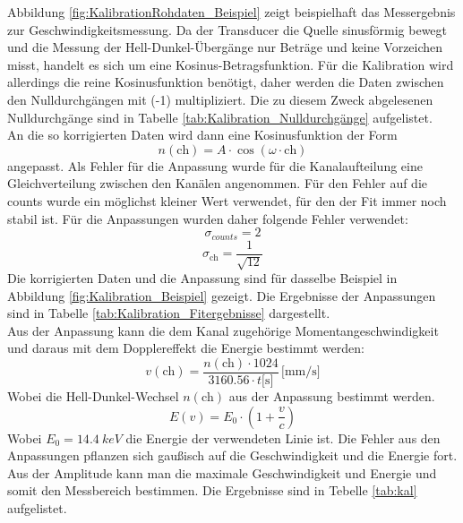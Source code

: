 \documentclass[12pt,a4paper]{article}
\begin{document}
Abbildung \ref{fig:KalibrationRohdaten_Beispiel} zeigt beispielhaft das Messergebnis zur Geschwindigkeitsmessung. Da der Transducer die Quelle sinusförmig bewegt und die Messung der Hell-Dunkel-Übergänge nur Beträge und keine Vorzeichen misst, handelt es sich um eine Kosinus-Betragsfunktion. Für die Kalibration wird allerdings die reine Kosinusfunktion benötigt, daher werden die Daten zwischen den Nulldurchgängen mit (-1) multipliziert. Die zu diesem Zweck abgelesenen Nulldurchgänge sind in Tabelle \ref{tab:Kalibration_Nulldurchgänge} aufgelistet. \\
An die so korrigierten Daten wird dann eine Kosinusfunktion der Form
\begin{equation*}
n(\textrm{ch}) = A \cdot \cos (\omega \cdot \textrm{ch})
\end{equation*}
angepasst. Als Fehler für die Anpassung wurde für die Kanalaufteilung eine Gleichverteilung zwischen den Kanälen angenommen. Für den Fehler auf die counts wurde ein möglichst kleiner Wert verwendet, für den der Fit immer noch stabil ist. Für die Anpassungen wurden daher folgende Fehler verwendet:
\begin{equation*}
\sigma _{counts} = 2
\end{equation*}
\begin{equation*}
\sigma _\textrm{ch} = \dfrac{1}{\sqrt{12}}
\end{equation*}
Die korrigierten Daten und die Anpassung sind für dasselbe Beispiel in Abbildung \ref{fig:Kalibration_Beispiel} gezeigt. Die Ergebnisse der Anpassungen sind in Tabelle \ref{tab:Kalibration_Fitergebnisse} dargestellt. \\
Aus der Anpassung kann die dem Kanal zugehörige Momentangeschwindigkeit und daraus mit dem Dopplereffekt die Energie bestimmt werden:
\begin{equation*}
v(\textrm{ch}) = \dfrac{n(\textrm{ch}) \cdot 1024}{3160.56 \cdot t \textrm{[s]}} \, \textrm{[mm/s]}
\end{equation*}
Wobei die Hell-Dunkel-Wechsel $n(\textrm{ch})$ aus der Anpassung bestimmt werden.
\begin{equation*}
E(v) = E_0 \cdot \left(1 + \dfrac{v}{c}\right)
\end{equation*}
Wobei $E_0 = \SI{14,4}{keV}$ die Energie der verwendeten Linie ist. Die Fehler aus den Anpassungen pflanzen sich gaußisch auf die Geschwindigkeit und die Energie fort.\\
Aus der Amplitude kann man die maximale Geschwindigkeit und Energie und somit den Messbereich bestimmen. Die Ergebnisse sind in Tebelle \ref{tab:kal} aufgelistet.
\end{document}
